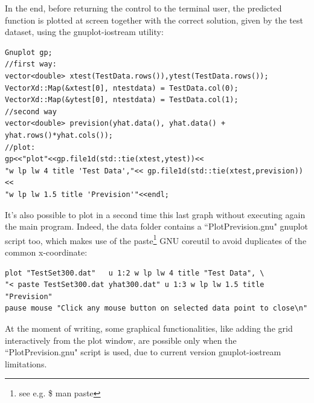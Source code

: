 \documentclass[12pt, a4paper]{report}
\theoremstyle{definition}
\begin{document}
In the end, before returning the control to the terminal user, the predicted function is plotted at screen together with the correct solution, given by the test dataset, using the gnuplot-iostream utility:
\begin{lstlisting}[frame=single, showstringspaces=false]
Gnuplot gp;
//first way:
vector<double> xtest(TestData.rows()),ytest(TestData.rows());
VectorXd::Map(&xtest[0], ntestdata) = TestData.col(0);
VectorXd::Map(&ytest[0], ntestdata) = TestData.col(1);
//second way
vector<double> prevision(yhat.data(), yhat.data() + yhat.rows()*yhat.cols());
//plot:
gp<<"plot"<<gp.file1d(std::tie(xtest,ytest))<<
"w lp lw 4 title 'Test Data',"<< gp.file1d(std::tie(xtest,prevision))<<
"w lp lw 1.5 title 'Prevision'"<<endl;
\end{lstlisting}
It's also possible to plot in a second time this last graph without executing again the main program. Indeed, the data folder contains a ``PlotPrevision.gnu" gnuplot script too, which makes use of the {\ttfamily paste}\footnote{ see e.g. {\ttfamily \$ man paste}} GNU coreutil to avoid duplicates of the common x-coordinate:
\begin{lstlisting}[frame=single, showstringspaces=false]
plot "TestSet300.dat"	u 1:2 w lp lw 4 title "Test Data", \
"< paste TestSet300.dat yhat300.dat" u 1:3 w lp lw 1.5 title "Prevision"
pause mouse "Click any mouse button on selected data point to close\n"
\end{lstlisting}
At the moment of writing, some graphical functionalities, like adding the grid interactively from the plot window, are possible only when the ``PlotPrevision.gnu" script is used, due to current version gnuplot-iostream limitations.


\end{document}
